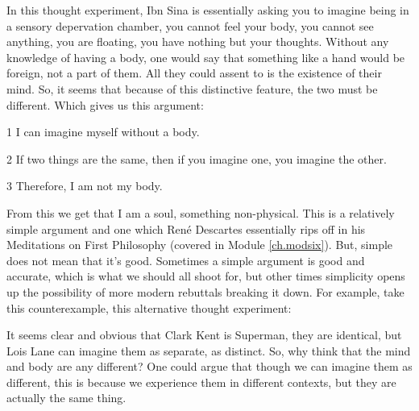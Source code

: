 In this thought experiment, Ibn Sina is essentially asking you to imagine being in a sensory depervation chamber, you cannot feel your body, you cannot see anything, you are floating, you have nothing but your thoughts. Without any knowledge of having a body, one would say that something like a hand would be foreign, not a part of them. All they could assent to is the existence of their mind. So, it seems that because of this distinctive feature, the two must be different. Which gives us this argument: 

\begin{earg}
    \item[1 ] I can imagine myself without a body.
    \item[2 ] If two things are the same, then if you imagine one, you imagine the other.
    \item[3 ] Therefore, I am not my body.
\end{earg}

From this we get that I am a soul, something non-physical. This is a relatively simple argument and one which Ren\'e Descartes essentially rips off in his Meditations on First Philosophy (covered in Module \ref{ch.modsix}). But, simple does not mean that it's good. Sometimes a simple argument is good and accurate, which is what we should all shoot for, but other times simplicity opens up the possibility of more modern rebuttals breaking it down. For example, take this counterexample, this alternative thought experiment:


It seems clear and obvious that Clark Kent is Superman, they are identical, but Lois Lane can imagine them as separate, as distinct. So, why think that the mind and body are any different? One could argue that though we can imagine them as different, this is because we experience them in different contexts, but they are actually the same thing.

